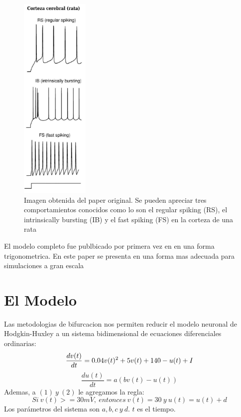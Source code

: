 \documentclass[12pt]{article}
\begin{document}
\begin{figure}
    \centering
        \includegraphics[height=10cm]{images/rata.jpg}
    \caption[fontsize=2pt]{Imagen obtenida del paper original. Se pueden apreciar tres comportamientos conocidos como lo son el regular spiking (RS), el intrinsically bursting (IB) y el fast spiking (FS) en la corteza de una rata}
\end{figure}

El modelo completo fue publbicado por primera vez en \cite{modeloPrimero} en una forma trigonometrica. En este paper se presenta en una forma mas adecuada para simulaciones a gran escala

\section{El Modelo}
Las metodologias de bifurcacion \cite{bifurcacion} nos permiten reducir el modelo neuronal de Hodgkin-Huxley a un sistema bidimensional de ecuaciones diferenciales ordinarias:
\begin{equation}
    \frac{dv(t)}{dt} = 0.04 v(t)^2 + 5 v(t) + 140 - u(t) + I\\
\end{equation}
\begin{equation}
    \frac{du(t)}{dt} = a(b v(t) - u(t))
\end{equation}
Ademas, a $(1) \ y  \ (2)$ le agregamos la regla:
\begin{equation}
    Si \ v(t) >= 30 mV,\ entonces \
        v(t) = 30 \ y \ u(t) = u(t) + d
\end{equation}
Los parámetros del sistema son $a, b, c \ y \ d$. $t$ es el tiempo. \\ \\
\end{document}
